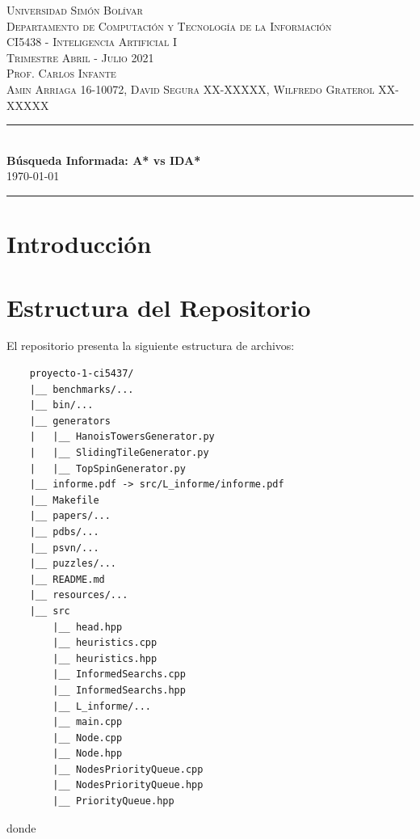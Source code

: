 \documentclass[a4paper,10pt]{article}
\date{}
\newcommand{\HRule}{\rule{\linewidth}{0.5mm}}
\begin{document}
\begin{center}
  \textsc {
    Universidad Simón Bolívar \\[0cm]
    Departamento de Computaci\'on y Tecnolog\'ia de la Informaci\'on \\[0cm]
    CI5438 - Inteligencia Artificial I \\[0cm]
    Trimestre Abril - Julio 2021 \\[0cm]
    Prof. Carlos Infante \\[0cm]
    Amin Arriaga 16-10072, David Segura XX-XXXXX, Wilfredo Graterol XX-XXXXX
  }
  \HRule \\[0.4cm]
  {\Large \textbf{B\'usqueda Informada: A* vs IDA*}} \\[0.4cm]
  \textsc{
    \today
  }
  \HRule
\end{center}

\section{Introducci\'on}

\section{Estructura del Repositorio}
  El repositorio presenta la siguiente estructura de archivos:

  \begin{verbatim}
    proyecto-1-ci5437/
    |__ benchmarks/...
    |__ bin/...
    |__ generators
    |   |__ HanoisTowersGenerator.py
    |   |__ SlidingTileGenerator.py
    |   |__ TopSpinGenerator.py
    |__ informe.pdf -> src/L_informe/informe.pdf
    |__ Makefile
    |__ papers/...
    |__ pdbs/...
    |__ psvn/...
    |__ puzzles/...
    |__ README.md
    |__ resources/...
    |__ src
        |__ head.hpp
        |__ heuristics.cpp
        |__ heuristics.hpp
        |__ InformedSearchs.cpp
        |__ InformedSearchs.hpp
        |__ L_informe/...
        |__ main.cpp
        |__ Node.cpp
        |__ Node.hpp
        |__ NodesPriorityQueue.cpp
        |__ NodesPriorityQueue.hpp
        |__ PriorityQueue.hpp
  \end{verbatim}

  donde 
\end{document}
